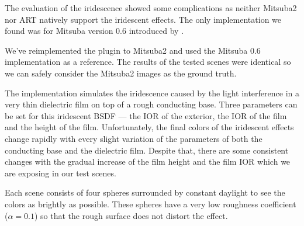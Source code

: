 The evaluation of the iridescence showed some complications as neither Mitsuba2 nor ART natively support the iridescent effects. The only implementation we found was for Mitsuba version 0.6 introduced by \citet{belcour2017practical}.

We've reimplemented the plugin to Mitsuba2 and used the Mitsuba 0.6 implementation as a reference. The results of the tested scenes were identical so we can safely consider the Mitsuba2 images as the ground truth.

The implementation simulates the iridescence caused by the light interference in a very thin dielectric film on top of a rough conducting base. Three parameters can be set for this iridescent BSDF --- the IOR of the exterior, the IOR of the film and the height of the film. Unfortunately, the final colors of the iridescent effects change rapidly with every slight variation of the parameters of both the conducting base and the dielectric film. Despite that, there are some consistent changes with the gradual increase of the film height and the film IOR which we are exposing in our test scenes. 

Each scene consists of four spheres surrounded by constant daylight to see the colors as brightly as possible. These spheres have a very low roughness coefficient ($\alpha=0.1$) so that the rough surface does not distort the effect.

